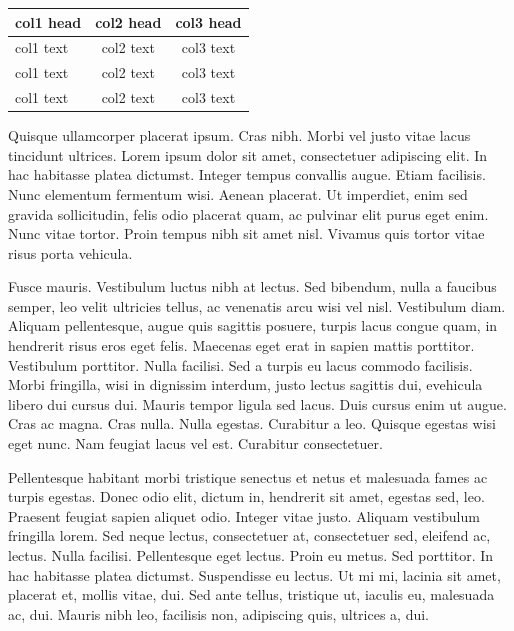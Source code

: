 \documentclass[APA,LATO1COL]{WileyNJD-v2}
\begin{document}
\begin{center}
\begin{tabular*}{300pt}{@{\extracolsep\fill}lcc@{\extracolsep\fill}}%
\toprule
\textbf{col1 head} & \textbf{col2 head} & \textbf{col3 head} \\
\midrule
col1 text & col2 text & col3 text \\
col1 text & col2 text & col3 text \\
col1 text & col2 text & col3 text \\
\bottomrule
\end{tabular*}
\end{center}


Quisque ullamcorper placerat ipsum. Cras nibh. Morbi vel justo vitae lacus tincidunt ultrices. Lorem ipsum dolor sit
amet, consectetuer adipiscing elit. In hac habitasse platea dictumst. Integer tempus convallis augue. Etiam facilisis.
Nunc elementum fermentum wisi. Aenean placerat. Ut imperdiet, enim sed gravida sollicitudin, felis odio placerat
quam, ac pulvinar elit purus eget enim. Nunc vitae tortor. Proin tempus nibh sit amet nisl. Vivamus quis tortor
vitae risus porta vehicula.

Fusce mauris. Vestibulum luctus nibh at lectus. Sed bibendum, nulla a faucibus semper, leo velit ultricies tellus, ac
venenatis arcu wisi vel nisl. Vestibulum diam. Aliquam pellentesque, augue quis sagittis posuere, turpis lacus congue
quam, in hendrerit risus eros eget felis. Maecenas eget erat in sapien mattis porttitor. Vestibulum porttitor. Nulla
facilisi. Sed a turpis eu lacus commodo facilisis. Morbi fringilla, wisi in dignissim interdum, justo lectus sagittis dui, evehicula libero dui cursus dui. Mauris tempor ligula sed lacus. Duis cursus enim ut augue. Cras ac magna. Cras nulla.
Nulla egestas. Curabitur a leo. Quisque egestas wisi eget nunc. Nam feugiat lacus vel est. Curabitur consectetuer.

Pellentesque habitant morbi tristique senectus et netus et malesuada fames ac turpis egestas. Donec odio elit,
dictum in, hendrerit sit amet, egestas sed, leo. Praesent feugiat sapien aliquet odio. Integer vitae justo. Aliquam
vestibulum fringilla lorem. Sed neque lectus, consectetuer at, consectetuer sed, eleifend ac, lectus. Nulla facilisi.
Pellentesque eget lectus. Proin eu metus. Sed porttitor. In hac habitasse platea dictumst. Suspendisse eu lectus. Ut
mi mi, lacinia sit amet, placerat et, mollis vitae, dui. Sed ante tellus, tristique ut, iaculis eu, malesuada ac, dui.
Mauris nibh leo, facilisis non, adipiscing quis, ultrices a, dui.
\end{document}
